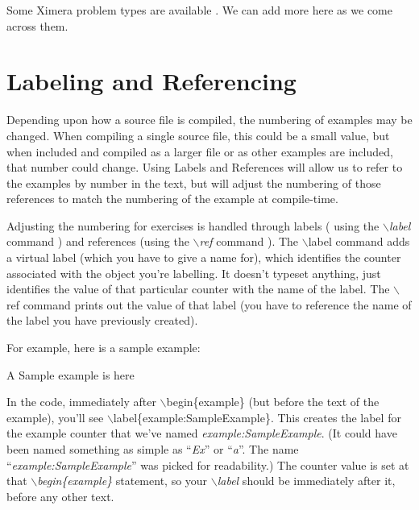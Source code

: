 \documentclass[nooutcomes]{ximera}
\begin{document}
Some Ximera problem types are available .  We can add more here as we come across them.


\section{Labeling and Referencing}

Depending upon how a source file is compiled, the numbering of examples may be changed. When compiling a single source file, this could be a small value,
but when included and compiled as a larger file or as other examples are included, that number could change. Using Labels and References will allow us to 
refer to the examples by number in the text, but will adjust the numbering of those references to match the numbering of the example at compile-time.


Adjusting the numbering for exercises is handled through labels ( using the $\backslash$\emph{label} command ) and references (using the $\backslash$\emph{ref} command ). 
The $\backslash$label command adds a virtual label (which you have to give a name for), which identifies the counter associated with the object you're labelling. It doesn't typeset anything, just identifies the value of that particular counter with the name of the label. 
The $\backslash$ref command prints out the value of that label (you have to reference the name of the label you have previously created).

For example, here is a sample example:
\begin{example}\label{example:SampleExample}
	A Sample example is here
\end{example}

In the code, immediately after $\backslash$begin\{example\} (but before the text of the example), you'll see 
$\backslash$label\{example:SampleExample\}. This creates the label for the 
example counter that we've named \emph{example:SampleExample}. (It could have been named something as simple as ``\emph{Ex}'' or ``\emph{a}''. 
The name ``\emph{example:SampleExample}'' was picked for readability.) 
The counter value is set at that $\backslash$\emph{begin\{example\}} statement, so your $\backslash$\emph{label} should be immediately after it,
before any other text.
\end{document}
